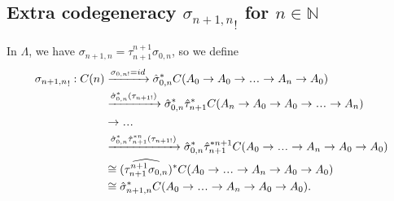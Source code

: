 \subsection{Extra codegeneracy 
  ${\sigma_{n+1,n}}_!$ for 
  $n \in \mathbb{N}$}
In $\Lambda$, we have $\sigma_{n+1,n} = 
\tau_{n+1}^{n+1} \sigma_{0,n}$, so we define 
\begin{align*}
{{\sigma}_{n+1,n}}_! : C(n)
& \xrightarrow{\sigma_{0,n!} = id}
\hat{\sigma}_{0,n}^*
  C(A_0 \to A_0 \to \smdots \to A_n \to A_0)\\
& \xrightarrow{\hat{\sigma}_{0,n}^*(\tau_{n+1!})}
\hat{\sigma}_{0,n}^*\hat{\tau}_{n+1}^*
  C(A_n \to A_0 \to A_0 \to \smdots \to A_n) \\
& \to \smdots \\
& \xrightarrow{\hat{\sigma}_{0,n}^*
  \hat{\tau}_{n+1}^{*n}(\tau_{n+1!})}
  \hat{\sigma}_{0,n}^*\hat{\tau}_{n+1}^{*n+1}
  C(A_0 \to \smdots \to A_n \to A_0 \to A_0) \\
&\cong
(\widehat{\tau_{n+1}^{n+1} \sigma_{0,n}})^*
  C(A_0 \to \smdots \to A_n \to A_0 \to A_0)\\
&\cong
\hat{\sigma}_{n+1,n}^*
C(A_0 \to \smdots \to A_n \to A_0 \to A_0).
\end{align*}
